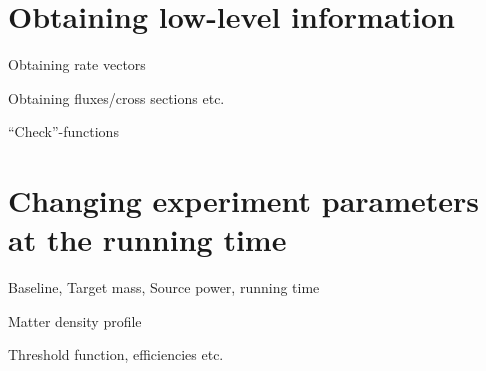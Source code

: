 \chapter{Obtaining low-level information}

\bi
\item
 Obtaining rate vectors
\item
 Obtaining fluxes/cross sections etc.
\item
 ``Check''-functions
\ei

\chapter{Changing experiment parameters at the running time}

\bi
\item
 Baseline, Target mass, Source power, running time
\item
 Matter density profile
\item
 Threshold function, efficiencies etc.
\ei